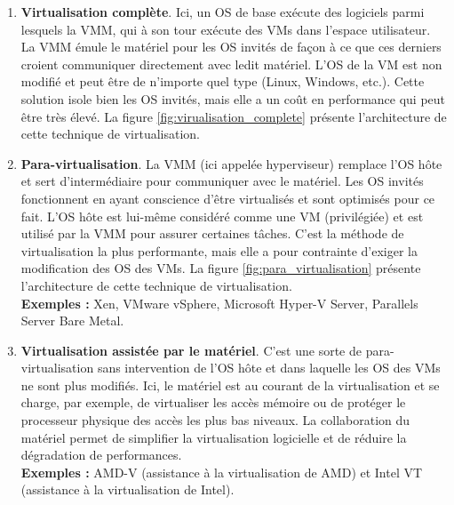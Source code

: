 \begin{enumerate}[label=\textbf{(\roman*)}]
    \item \textbf{Virtualisation complète}. Ici, un OS de base exécute des logiciels parmi lesquels la VMM, qui à son tour exécute des VMs dans l'espace utilisateur. La VMM émule le matériel pour les OS invités de façon à ce que ces derniers croient communiquer directement avec ledit matériel. L'OS de la VM est non modifié et peut être de n'importe quel type (Linux, Windows, etc.). Cette solution isole bien les OS invités, mais elle a un coût en performance qui peut être très élevé.  La figure \ref{fig:virualisation_complete} présente l'architecture de cette technique de virtualisation.
    
    \item \textbf{Para-virtualisation}. La VMM (ici appelée hyperviseur) remplace l'OS hôte et sert d'intermédiaire pour communiquer avec le matériel. Les OS invités fonctionnent en ayant conscience d'être virtualisés et sont optimisés pour ce fait. L'OS hôte est lui-même considéré comme une VM (privilégiée) et est utilisé par la VMM pour assurer certaines tâches. C'est la méthode de virtualisation la plus performante, mais elle a pour contrainte d'exiger la modification des OS des VMs. La figure \ref{fig:para_virtualisation} présente l'architecture de cette technique de virtualisation.
    \\ \textbf{Exemples :} Xen, VMware vSphere,  Microsoft Hyper-V Server, Parallels Server Bare Metal.
    
    \item \textbf{Virtualisation assistée par le matériel}. C'est une sorte de para-virtualisation sans intervention de l'OS hôte et dans laquelle les OS des VMs ne sont plus modifiés. Ici, le matériel est au courant de la virtualisation et se charge, par exemple, de virtualiser les accès mémoire ou de protéger le processeur physique des accès les plus bas niveaux. La collaboration du matériel permet de simplifier la virtualisation logicielle et de réduire la dégradation de performances.
    \\ \textbf{Exemples :} AMD-V (assistance à la virtualisation de AMD) et Intel VT (assistance à la virtualisation de Intel).
\end{enumerate}


